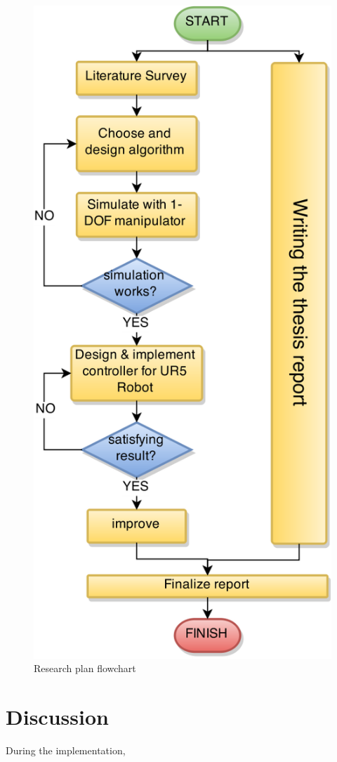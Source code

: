 \begin{figure}
\centering
\includegraphics[width=0.5\linewidth]{Drawing1}
\caption{Research plan flowchart}
\label{fig:flowchart}
\end{figure}

\section{Discussion}\label{sec:discussion}
During the implementation, 
